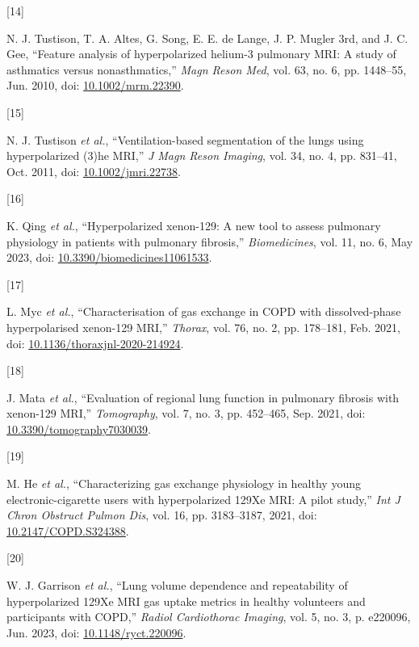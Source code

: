 \documentclass[
  11pt,
]{article}
\newlength{\cslhangindent}
\newlength{\csllabelwidth}
\newenvironment{CSLReferences}[2] %
 {%
  \setlength{\parindent}{0pt}
  \ifodd #1 \everypar{\setlength{\hangindent}{\cslhangindent}}\ignorespaces\fi
  \ifnum #2 > 0
  \setlength{\parskip}{#2\baselineskip}
  \fi
 }%
 {}
\newcommand{\CSLLeftMargin}[1]{\parbox[t]{\csllabelwidth}{#1}}
\newcommand{\CSLRightInline}[1]{\parbox[t]{\linewidth - \csllabelwidth}{#1}\break}
\begin{document}
\begin{CSLReferences}{0}{0}
\leavevmode{}%
\CSLLeftMargin{{[}14{]} }
\CSLRightInline{N. J. Tustison, T. A. Altes, G. Song, E. E. de Lange, J.
P. Mugler 3rd, and J. C. Gee, {``Feature analysis of hyperpolarized
helium-3 pulmonary MRI: A study of asthmatics versus nonasthmatics,''}
\emph{Magn Reson Med}, vol. 63, no. 6, pp. 1448--55, Jun. 2010, doi:
\href{https://doi.org/10.1002/mrm.22390}{10.1002/mrm.22390}.}

\leavevmode{}%
\CSLLeftMargin{{[}15{]} }
\CSLRightInline{N. J. Tustison \emph{et al.}, {``Ventilation-based
segmentation of the lungs using hyperpolarized (3)he MRI,''} \emph{J
Magn Reson Imaging}, vol. 34, no. 4, pp. 831--41, Oct. 2011, doi:
\href{https://doi.org/10.1002/jmri.22738}{10.1002/jmri.22738}.}

\leavevmode{}%
\CSLLeftMargin{{[}16{]} }
\CSLRightInline{K. Qing \emph{et al.}, {``Hyperpolarized xenon-129: A
new tool to assess pulmonary physiology in patients with pulmonary
fibrosis,''} \emph{Biomedicines}, vol. 11, no. 6, May 2023, doi:
\href{https://doi.org/10.3390/biomedicines11061533}{10.3390/biomedicines11061533}.}

\leavevmode{}%
\CSLLeftMargin{{[}17{]} }
\CSLRightInline{L. Myc \emph{et al.}, {``Characterisation of gas
exchange in COPD with dissolved-phase hyperpolarised xenon-129 MRI,''}
\emph{Thorax}, vol. 76, no. 2, pp. 178--181, Feb. 2021, doi:
\href{https://doi.org/10.1136/thoraxjnl-2020-214924}{10.1136/thoraxjnl-2020-214924}.}

\leavevmode{}%
\CSLLeftMargin{{[}18{]} }
\CSLRightInline{J. Mata \emph{et al.}, {``Evaluation of regional lung
function in pulmonary fibrosis with xenon-129 MRI,''} \emph{Tomography},
vol. 7, no. 3, pp. 452--465, Sep. 2021, doi:
\href{https://doi.org/10.3390/tomography7030039}{10.3390/tomography7030039}.}

\leavevmode{}%
\CSLLeftMargin{{[}19{]} }
\CSLRightInline{M. He \emph{et al.}, {``Characterizing gas exchange
physiology in healthy young electronic-cigarette users with
hyperpolarized 129Xe MRI: A pilot study,''} \emph{Int J Chron Obstruct
Pulmon Dis}, vol. 16, pp. 3183--3187, 2021, doi:
\href{https://doi.org/10.2147/COPD.S324388}{10.2147/COPD.S324388}.}

\leavevmode{}%
\CSLLeftMargin{{[}20{]} }
\CSLRightInline{W. J. Garrison \emph{et al.}, {``Lung volume dependence
and repeatability of hyperpolarized 129Xe MRI gas uptake metrics in
healthy volunteers and participants with COPD,''} \emph{Radiol
Cardiothorac Imaging}, vol. 5, no. 3, p. e220096, Jun. 2023, doi:
\href{https://doi.org/10.1148/ryct.220096}{10.1148/ryct.220096}.}


\end{CSLReferences}
\end{document}
